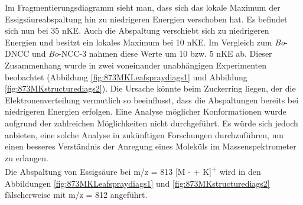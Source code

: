Im Fragmentierungsdiagramm sieht man, dass sich das lokale Maximum der Essigsäureabspaltung hin zu niedrigeren Energien verschoben hat. Es befindet sich nun bei  35 \gls{nKE}. Auch die  Abspaltung verschiebt sich zu niedrigeren Energien und besitzt ein lokales Maximum bei 10 \gls{nKE}. Im Vergleich zum \textit{Bo}-DNCC und \textit{Bo}-NCC-3 nahmen diese Werte um 10 bzw. 5 \gls{nKE} ab. Dieser Zusammenhang wurde in zwei voneinander unabhängigen Experimenten beobachtet (Abbildung \ref{fig:873MKLeafspraydiags1} und Abbildung \ref{fig:873MKstructurediags2}). Die Ursache könnte beim Zuckerring liegen, der die Elektronenverteilung vermutlich so beeinflusst, dass die Abspaltungen bereits bei niedrigeren Energien erfolgen. Eine Analyse möglicher Konformationen wurde aufgrund der zahlreichen Möglichkeiten nicht durchgeführt. Es würde sich jedoch anbieten, eine solche Analyse in zukünftigen Forschungen durchzuführen, um einen besseres Verständnis der Anregung eines Moleküls im Massenspektrometer zu erlangen. \\

Die Abspaltung von Essigsäure bei m/z = 813 [M -  + K]\textsuperscript{+} wird in den Abbildungen \ref{fig:873MKLeafspraydiags1} und \ref{fig:873MKstructurediags2} fälscherweise mit m/z = 812 angeführt. 

